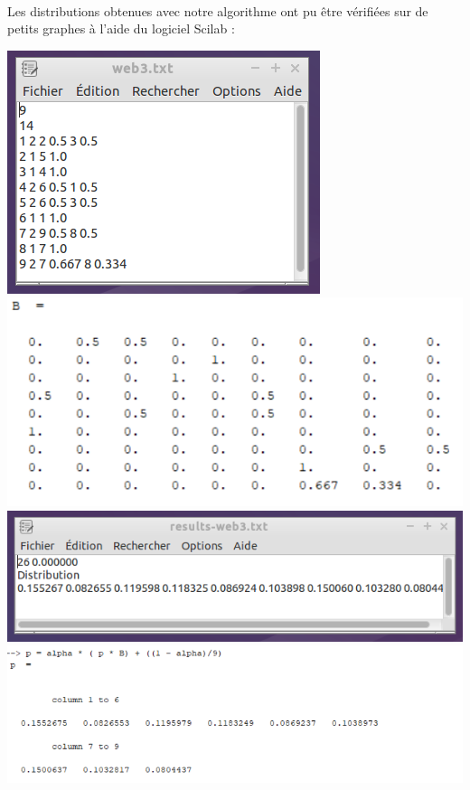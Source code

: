 		\paragraph{}Les distributions obtenues avec notre algorithme ont pu être vérifiées sur de petits graphes à l'aide du logiciel Scilab :\\
		\begin{center}
			\includegraphics[scale=0.5]{matrice.png}
			\includegraphics[scale=0.5]{matriceScilab.png}
			\includegraphics[scale=0.7]{distrib.png}
			\includegraphics[scale=0.5]{distribScilab.png}
		\end{center}
		
